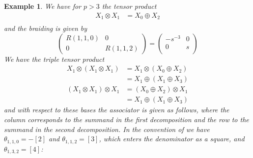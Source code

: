\documentclass[a4paper, reqno]{amsart}
\newtheorem{example}[theorem]{Example}
\theoremstyle{introTheorems}
\renewcommand{\1}{\mathbbold{1}}
\begin{document}
\begin{example}\label{exm_tripleProduct}
We have for $p>3$ the tensor product
\begin{align*}
X_1\otimes X_1 &= X_0 \oplus X_2 \\
\end{align*}
and the braiding is given by 
$$\begin{pmatrix}
    R(1,1,0) & 0 \\
    0 & R(1,1,2)
\end{pmatrix}
=
\begin{pmatrix}
    -s^{-3} & 0 \\
    0 & s \\
\end{pmatrix}
$$
We have the triple tensor product
\begin{align*}
X_1\otimes (X_1 \otimes X_1)
&=X_1\otimes (X_0 \oplus X_2)\\
&=X_1 \oplus (X_1 \oplus X_3)  \\
(X_1\otimes X_1) \otimes X_1
&=(X_0 \oplus X_2) \otimes X_1\\
&=X_1 \oplus (X_1 \oplus X_3)  
\end{align*}
and with respect to these bases the associator is given as follows, where the column corresponds to the summand in the first decomposition and the row to the summand in the second decomposition. In the convention of \cite{CM} we have $\theta_{1,1,0}=-[2]$ and $\theta_{1,1,2}=[3]$, which enters the denominator as a square, and 
 $\theta_{1,3,2}=[4]$:


\end{example}
\end{document}
